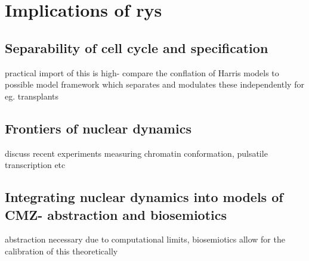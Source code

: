 \chapter{Implications of rys}
\label{chap:rysoutro}

\section{Separability of cell cycle and specification}
practical import of this is high- compare the conflation of Harris models to possible model framework which separates and modulates these independently for eg. transplants
\section{Frontiers of nuclear dynamics}
discuss recent experiments measuring chromatin conformation, pulsatile transcription etc
\section{Integrating nuclear dynamics into models of CMZ- abstraction and biosemiotics}
abstraction necessary due to computational limits, biosemiotics allow for the calibration of this theoretically


